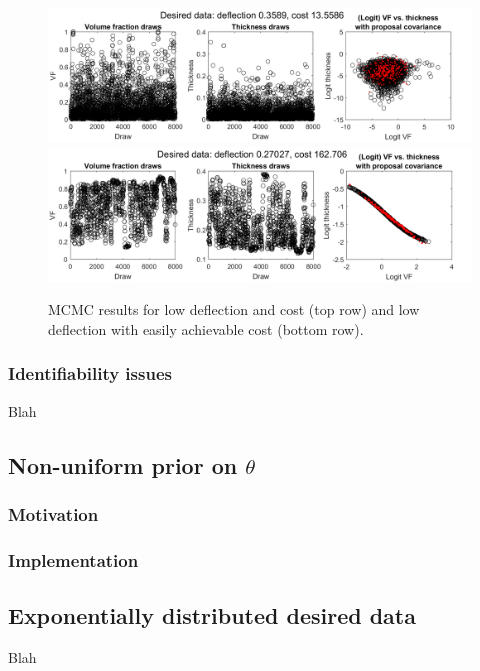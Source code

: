 \documentclass{article}
\begin{document}
\begin{figure}
\centering
\includegraphics[width=.9\linewidth]{FIG1}
\includegraphics[width=.9\linewidth]{FIG2}
\caption{MCMC results for low deflection and cost (top row) and low deflection with easily achievable cost (bottom row).}
\label{fig:des_data}
\end{figure}

\subsubsection{Identifiability issues}
Blah

\subsection{Non-uniform prior on $\theta$}\label{non-uniform_prior}

\subsubsection{Motivation}

\subsubsection{Implementation}



\subsection{Exponentially distributed desired data}
Blah
\end{document}
